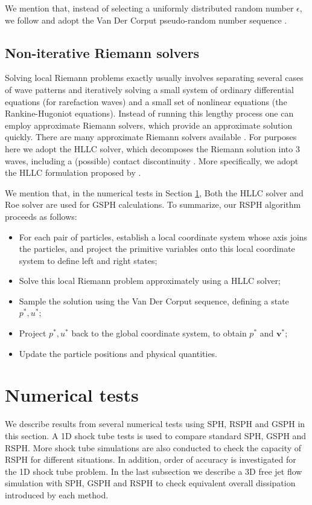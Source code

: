 \documentclass[review]{elsarticle}
\begin{document}
We mention that, instead of selecting a uniformly distributed random number $\epsilon$, we follow \citet{colella1982glimm} and adopt the Van Der Corput pseudo-random number sequence \citep{hammersley2013monte}.

\subsection{Non-iterative Riemann solvers} \label{sec:RP-solver}
Solving local Riemann problems exactly usually involves separating several cases of wave patterns and iteratively solving a small system of ordinary differential equations (for rarefaction waves) and a small set of nonlinear equations (the Rankine-Hugoniot equations). Instead of running this lengthy process one can employ approximate Riemann solvers, which provide an approximate solution quickly. There are many approximate Riemann solvers available \citep{rider1994review, luo2004computation, puri2014approximate}. For purposes here we adopt the HLLC solver, which decomposes the Riemann solution into 3 waves, including a (possible) contact discontinuity \cite{toro1994restoration}. More specifically, we adopt the HLLC formulation proposed by \citet{luo2004computation}.
 
We mention that, in the numerical tests in Section \ref{numericaltests}, Both the HLLC solver and Roe solver are used for GSPH calculations.
To summarize, our RSPH algorithm proceeds as follows:
\begin{itemize}
\item For each pair of particles, establish a local coordinate system whose axis joins the particles,
and project the primitive variables onto this local coordinate system to define left and right states;
\item Solve this local Riemann problem approximately using a HLLC solver;
\item Sample the solution using the Van Der Corput sequence, defining a state  $p^{\ast}, u^{\ast}$;
\item Project $p^{\ast}, u^{\ast}$  back to the global coordinate system, to obtain $p^{\ast}$ and $\textbf{v}^{\ast}$;
\item Update the particle positions and physical quantities.
\end{itemize}

\section{Numerical tests} \label{numericaltests}
We describe results from several numerical tests using SPH, RSPH and GSPH in this section.
A 1D shock tube tests is used to compare standard SPH, GSPH and RSPH. More shock tube simulations are also conducted to check the capacity of RSPH for different situations. In addition, order of accuracy is investigated for the 1D shock tube problem. In the last subsection we describe a 3D free jet flow simulation with SPH, GSPH and RSPH to check equivalent overall dissipation introduced by each method.
\end{document}
